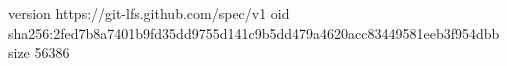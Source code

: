 version https://git-lfs.github.com/spec/v1
oid sha256:2fed7b8a7401b9fd35dd9755d141c9b5dd479a4620acc83449581eeb3f954dbb
size 56386
